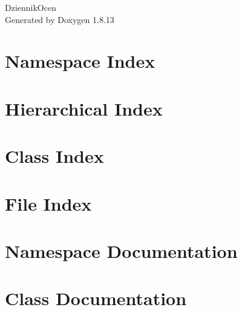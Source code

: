\documentclass[twoside]{book}
\newcommand{\+}{\discretionary{\mbox{\scriptsize$\hookleftarrow$}}{}{}}
\newcommand{\clearemptydoublepage}{%
  \newpage{\pagestyle{empty}\cleardoublepage}%
}
\begin{document}
\hypersetup{pageanchor=false,
             bookmarksnumbered=true,
             pdfencoding=unicode
            }
\begin{titlepage}
\vspace*{7cm}
\begin{center}%
{\Large Dziennik\+Ocen }\\
\vspace*{1cm}
{\large Generated by Doxygen 1.8.13}\\
\end{center}
\end{titlepage}
\clearemptydoublepage
{}
\tableofcontents
\clearemptydoublepage
{}
\hypersetup{pageanchor=true}

\chapter{Namespace Index}

\chapter{Hierarchical Index}

\chapter{Class Index}

\chapter{File Index}

\chapter{Namespace Documentation}

\chapter{Class Documentation}

















\end{document}
